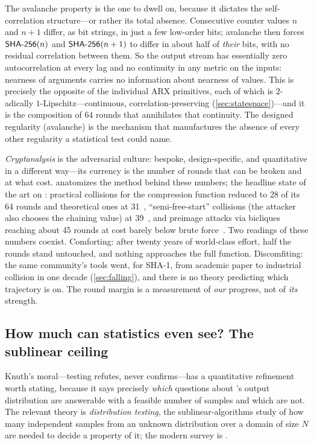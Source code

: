 The avalanche property is the one to dwell on, because it dictates the
self-correlation structure---or rather its total absence. Consecutive
counter values $n$ and $n+1$ differ, as bit strings, in just a few
low-order bits; avalanche then forces $\textsf{SHA-256}(n)$ and $\textsf{SHA-256}(n+1)$ to differ
in about half of \emph{their} bits, with no residual correlation between
them. So the output stream has essentially zero autocorrelation at every
lag and no continuity in any metric on the inputs: nearness of arguments
carries no information about nearness of values. This is precisely the
opposite of the individual ARX primitives, each of which is $2$-adically
$1$-Lipschitz---continuous, correlation-preserving
(\cref{sec:statespace})---and it is the composition of $64$ rounds that
annihilates that continuity. The designed regularity (avalanche) is the
mechanism that manufactures the absence of every other regularity a
statistical test could name.

\emph{Cryptanalysis} is the adversarial culture: bespoke,
design-specific, and quantitative in a different way---its currency is
the number of rounds that can be broken and at what cost.
 anatomizes the method behind these numbers; the
headline state of the art on \SHA{}: practical collisions for the
compression function reduced to 28 of its 64 rounds and theoretical
ones at 31~\citep{MendelNadSchlaffer2013}, ``semi-free-start''
collisions (the attacker also chooses the chaining value) at
39~\citep{LiLiuWang2024}, and preimage attacks via bicliques reaching
about 45 rounds at cost barely below brute force~\citep{KRS2012}. Two readings of these numbers
coexist. Comforting: after twenty years of world-class effort, half the
rounds stand untouched, and nothing approaches the full function.
Discomfiting: the same community's tools went, for SHA-1, from academic
paper to industrial collision in one decade (\cref{sec:falling}), and
there is no theory predicting which trajectory \SHA{} is on. The round
margin is a measurement of \emph{our} progress, not of \emph{its}
strength.

\subsection{How much can statistics even see? The sublinear ceiling}
\label{sec:disttest}

Knuth's moral---testing refutes, never confirms---has a quantitative
refinement worth stating, because it says precisely \emph{which}
questions about \SHA{}'s output distribution are answerable with a
feasible number of samples and which are not. The relevant theory is
\emph{distribution testing}, the sublinear-algorithms study of how many
independent samples from an unknown distribution over a domain of size
$N$ are needed to decide a property of it; the modern survey is
\citet{Canonne2020}.

